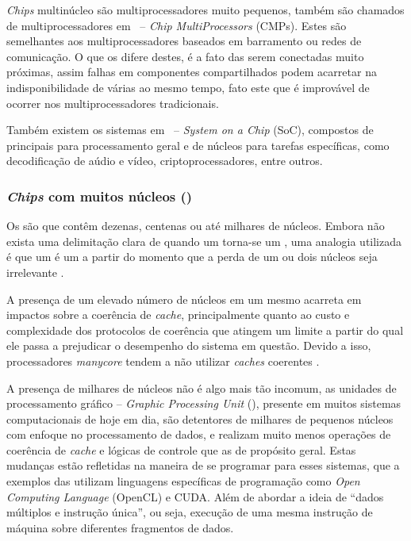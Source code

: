 \textit{Chips} multinúcleo são multiprocessadores muito pequenos, também são chamados de multiprocessadores em \chip~-- \textit{Chip MultiProcessors} (CMPs). Estes \chips são semelhantes aos multiprocessadores baseados em barramento ou redes de comunicação. O que os difere destes, é a fato das \cpus serem  conectadas muito próximas, assim falhas em componentes compartilhados podem acarretar na indisponibilidade de várias \cpus ao mesmo tempo, fato este que é improvável de ocorrer nos multiprocessadores tradicionais.

Também existem os sistemas em \chip~-- \textit{System on a Chip} (SoC), compostos de \cpus principais para processamento geral e de núcleos para tarefas específicas, como decodificação de aúdio e vídeo, criptoprocessadores, entre outros.

\subsubsection{\textit{Chips} com muitos núcleos (\manycore)}
\label{subsubsec:chips-manycore}

Os \manycore são \multicore que contêm dezenas, centenas ou até milhares de núcleos. Embora não exista uma delimitação clara de quando um \multicore torna-se um \manycore, uma analogia utilizada é que um \multicore é um \manycore a partir do momento que a perda de um ou dois núcleos seja irrelevante \cite{Tanenbaum:2014:MOS:2655363}.

A presença de um elevado número de núcleos em um mesmo \chip acarreta em impactos sobre a coerência de \textit{cache}, principalmente quanto ao custo e complexidade dos protocolos de coerência que atingem um limite a partir do qual ele passa a prejudicar o desempenho do sistema em questão. Devido a isso, processadores \textit{manycore} tendem a não utilizar \textit{caches} coerentes \cite{Tanenbaum:2014:MOS:2655363}.

A presença de milhares de núcleos não é algo mais tão incomum, as unidades de processamento gráfico -- \textit{Graphic Processing Unit} (\gpu), presente em muitos sistemas computacionais de hoje em dia, são detentores de milhares de pequenos núcleos com enfoque no processamento de dados, e realizam muito menos operações de coerência de \textit{cache} e lógicas de controle que as \cpus de propósito geral. Estas mudanças estão refletidas na maneira de se programar para esses sistemas, que a exemplos das \gpus utilizam linguagens específicas de programação como \textit{Open Computing Language} (OpenCL) e CUDA. Além de abordar a ideia de ``dados múltiplos e instrução única'', ou seja, execução de uma mesma instrução de máquina sobre diferentes fragmentos de dados. 

